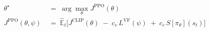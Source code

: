 \begin{align*}
\theta^\star \,&=\; \arg\max_{\theta} J^{\scriptscriptstyle\text{PPO}}(\theta) \\
J^{\scriptscriptstyle\text{PPO}}(\theta, \psi) \;&=\;
\mathbb{\hat{E}}_t \Big[
J^{\scriptscriptstyle\text{CLIP}}(\theta)
\;-\; c_v \, L^{\scriptscriptstyle\text{VF}}(\psi)
\;+\; c_e \, S[\pi_\theta](s_t)
\Big]
\end{align*}